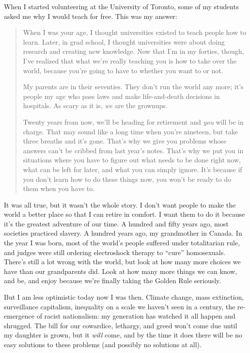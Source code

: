 
When I started volunteering at the University of Toronto,
some of my students asked me why I would teach for free.
This was my answer:

\begin{quote}

When I was your age,
I thought universities existed to teach people how to learn.
Later,
in grad school,
I thought universities were about doing research and creating new knowledge.
Now that I'm in my forties,
though,
I've realized that what we're really teaching you is
how to take over the world,
because you're going to have to whether you want to or not.

My parents are in their seventies.
They don't run the world any more;
it's people my age who pass laws
and make life-and-death decisions in hospitals.
As scary as it is,
\emph{we} are the grownups.

Twenty years from now,
we'll be heading for retirement and \emph{you} will be in charge.
That may sound like a long time when you're nineteen,
but take three breaths and it's gone.
That's why we give you problems whose answers can't be cribbed from last year's notes.
That's why we put you in situations where
you have to figure out what needs to be done right now,
what can be left for later,
and what you can simply ignore.
It's because if you don't learn how to do these things now,
you won't be ready to do them when you have to.

\end{quote}

It was all true,
but it wasn't the whole story.
I don't want people to make the world a better place so that I can retire in comfort.
I want them to do it because it's the greatest adventure of our time.
A hundred and fifty years ago,
most societies practiced slavery.
A hundred years ago,
my grandmother  in Canada.
In the year I was born,
most of the world's people suffered under totalitarian rule,
and judges were still ordering electroshock therapy to ``cure'' homosexuals.
There's still a lot wrong with the world,
but look at how many more choices we have than our grandparents did.
Look at how many more things we can know, and be, and enjoy
because we're finally taking the Golden Rule seriously.

But I am less optimistic today now I was then.
Climate change,
mass extinction,
surveillance capitalism,
inequality on a scale we haven't seen in a century,
the re-emergence of racist nationalism:
my generation has watched it all happen and shrugged.
The bill for our cowardice, lethargy, and greed won't come due until my daughter is grown,
but it \emph{will} come,
and by the time it does there will be no easy solutions to these problems
(and possibly no solutions at all).

